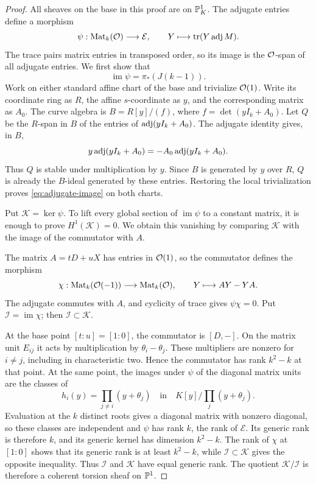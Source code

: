 \begin{proof}
All sheaves on the base in this proof are on \(\mathbb P^1_K\).
The adjugate entries define a morphism
\[
 \psi:\operatorname{Mat}_k(\mathcal O)\longrightarrow\mathcal E,\qquad
       Y\longmapsto\operatorname{tr}(Y\operatorname{adj} M).
\]
The trace pairs matrix entries in transposed order, so its image is
the \(\mathcal O\)-span of all adjugate entries.  We first show that
\begin{equation}
 \label{eq:adjugate-image}
 \operatorname{im}\psi=\pi_*(J(k-1)).
\end{equation}
Work on either standard affine chart of the base and trivialize
\(\mathcal O(1)\).  Write its coordinate ring as \(R\), the affine
\(s\)-coordinate as \(y\), and the corresponding matrix as \(A_0\).
The curve algebra is \(B=R[y]/(f)\), where
\(f=\det(yI_k+A_0)\).  Let \(Q\) be the \(R\)-span in \(B\) of the
entries of \(\operatorname{adj}(yI_k+A_0)\).
The adjugate identity gives, in \(B\),
\[
 y\operatorname{adj}(yI_k+A_0)=-A_0\operatorname{adj}(yI_k+A_0).
\]
Thus \(Q\) is stable under multiplication by \(y\).  Since \(B\) is
generated by \(y\) over \(R\), \(Q\) is already the \(B\)-ideal
generated by these entries.  Restoring the local trivialization
proves \eqref{eq:adjugate-image} on both charts.

Put \(\mathcal K=\ker\psi\).  To lift every global section of
\(\operatorname{im}\psi\) to a constant matrix, it is enough to prove
\(H^1(\mathcal K)=0\).  We obtain this vanishing by comparing
\(\mathcal K\) with the image of the commutator with \(A\).

The matrix \(A=tD+uX\) has entries in \(\mathcal O(1)\), so the commutator
defines the morphism
\[
 \chi:\operatorname{Mat}_k(\mathcal O(-1))\longrightarrow\operatorname{Mat}_k(\mathcal O),\qquad
       Y\longmapsto AY-YA.
\]
The adjugate commutes with \(A\), and cyclicity of trace gives
\(\psi\chi=0\).  Put \(\mathcal I=\operatorname{im}\chi\); then
\(\mathcal I\subset\mathcal K\).

At the base point \([t:u]=[1:0]\), the commutator is \([D,-]\).
On the matrix unit \(E_{ij}\) it acts by multiplication by
\(\theta_i-\theta_j\).  These multipliers are nonzero for \(i\ne j\),
including in characteristic two.  Hence the commutator has rank
\(k^2-k\) at that point.
At the same point, the images under \(\psi\) of the diagonal matrix
units are the classes of
\[
 h_i(y)=\prod_{j\ne i}(y+\theta_j)
 \quad\text{in}\quad K[y]\big/\prod_j(y+\theta_j).
\]
Evaluation at the \(k\) distinct roots gives a diagonal matrix with
nonzero diagonal, so these classes are independent and \(\psi\)
has rank \(k\), the rank of \(\mathcal E\).  Its generic rank is
therefore \(k\), and its generic kernel has dimension \(k^2-k\).
The rank of \(\chi\) at \([1:0]\) shows that its generic rank is at
least \(k^2-k\), while \(\mathcal I\subset\mathcal K\) gives the
opposite inequality.  Thus \(\mathcal I\) and \(\mathcal K\) have
equal generic rank.
The quotient \(\mathcal K/\mathcal I\) is therefore a coherent
torsion sheaf on \(\mathbb P^1\).


\end{proof}
